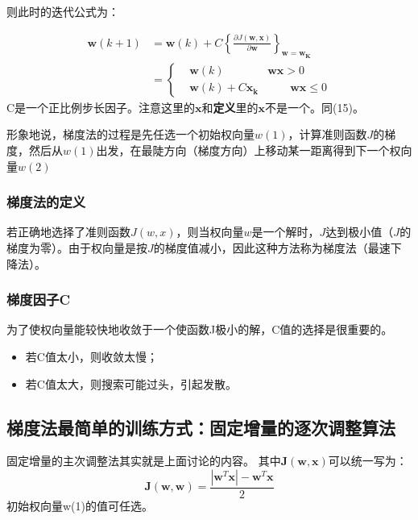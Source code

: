 \documentclass[12pt, letterpaper]{article}
\begin{document}
则此时的迭代公式为：

\begin{equation}
\begin{aligned}
\mathbf{w}(k+1)&=\mathbf{w}(k)+C\left\{ \frac{\partial J(\mathbf{w}, \mathbf{x})}{\partial \mathbf{w}}\right\}_{\mathbf{w}=\mathbf{w_K}}\\
&=
\left\{
\begin{aligned}
& \mathbf{w}(k) \qquad &\mathbf{w}\mathbf{x}>0\\
& \mathbf{w}(k)+C\mathbf{x_k} &\qquad \mathbf{wx}\leq0
\end{aligned}
\right.
\end{aligned}
\end{equation}
C是一个正比例步长因子。注意这里的$\mathbf{x}$和\textbf{定义}里的$\mathbf{x}$不是一个。同(15)。

形象地说，梯度法的过程是先任选一个初始权向量$w(1)$，计算准则函数$J$的梯度，然后从$w(1)$出发，在最陡方向（梯度方向）上移动某一距离得到下一个权向量$w(2)$

\subsubsection*{梯度法的定义} 
若正确地选择了准则函数$J(w,x)$，则当权向量$w$是一个解时，$J$达到极小值（$J$的梯度为零）。由于权向量是按$J$的梯度值减小，因此这种方法称为梯度法（最速下降法）。

\subsubsection*{梯度因子\textbf{C}}
为了使权向量能较快地收敛于一个使函数J极小的解，C值的选择是很重要的。
\begin{itemize}
\item 
若C值太小，则收敛太慢；
\item 
若C值太大，则搜索可能过头，引起发散。
\end{itemize}

\subsection{梯度法最简单的训练方式：固定增量的逐次调整算法}
固定增量的主次调整法其实就是上面讨论的内容。
其中$\mathbf{J}(\mathbf{w},\mathbf{x})$可以统一写为：
\begin{equation}
\mathbf{J}(\mathbf{w},\mathbf{w})=\frac{|\mathbf{w}^T\mathbf{x}|-\mathbf{w}^T\mathbf{x}}{2}
\end{equation}
初始权向量w(1)的值可任选。
\end{document}
